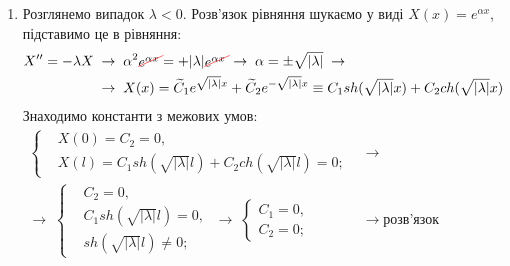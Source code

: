 \documentclass[a4paper, 12pt]{extreport}
\begin{document}
\begin{enumerate}
\begin{enumerate}
        \item Розглянемо випадок $\lambda < 0$. Розв'язок рівняння шукаємо у виді $X(x) = e^{\alpha x}$, підставимо це в рівняння: 
        \begin{equation*}
            \begin{aligned}
                X^{\prime\prime} = -\lambda X
                \;&\to\;
                \alpha^2 \textcolor{red}{\begin{xy}*{\textcolor{black}{e^{\alpha x}}};p+LD;+RU**h@{}+/\jot/**h@{-}\end{xy}} = +|\lambda| \textcolor{red}{\begin{xy}*{\textcolor{black}{e^{\alpha x}}};p+LD;+RU**h@{}+/\jot/**h@{-}\end{xy}}
                \;\to\;
                \alpha = \pm \sqrt{|\lambda|}
                \;\to\\
                &\to\;
                X(x) = \widetilde{C}_1 e^{\sqrt{|\lambda|}x} + \widetilde{C}_2 e^{-\sqrt{|\lambda|}x} \equiv C_1 sh(\sqrt{|\lambda|}x) + C_2 ch({\sqrt{|\lambda|}x})
            \end{aligned}
        \end{equation*}
        Знаходимо константи з межових умов:
        \begin{equation*}
            \begin{aligned}
                \left\{ \begin{aligned}
                    &X(0) = C_2 = 0, \\ 
                    &X(l) = C_1 sh(\sqrt{|\lambda|}l) + C_2 ch({\sqrt{|\lambda|}l}) = 0;
                \end{aligned} \right.
                \;&\to\\
                \to\;
                \left\{ \begin{aligned}
                    &C_2 = 0, \\ 
                    &C_1 sh(\sqrt{|\lambda|}l) = 0, \\
                    &sh(\sqrt{|\lambda|}l) \neq 0;
                \end{aligned} \right.
                \;\to\;
                \left\{ \begin{aligned}
                    C_1 = 0, \\ 
                    C_2 = 0;
                \end{aligned} \right.
                \;&\to\;
                \text{розв'язок тривівльний}
            \end{aligned}
        \end{equation*}
    

\end{enumerate}
\end{enumerate}
\end{document}
